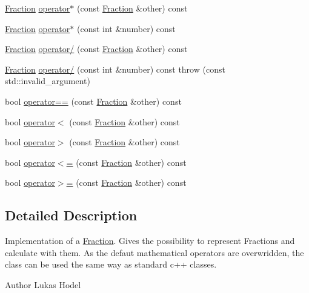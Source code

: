 \begin{DoxyCompactItemize}
\item 
\hyperlink{classFraction}{Fraction} \hyperlink{classFraction_ab742d856770b1ec746aedf6382ee35df}{operator$\ast$} (const \hyperlink{classFraction}{Fraction} \&other) const 
\item 
\hyperlink{classFraction}{Fraction} \hyperlink{classFraction_adfde5a22f3fe5b0b70c3008162ca014b}{operator$\ast$} (const int \&number) const 
\item 
\hyperlink{classFraction}{Fraction} \hyperlink{classFraction_a572eedd14d4ec9e42a65130029aac360}{operator/} (const \hyperlink{classFraction}{Fraction} \&other) const 
\item 
\hyperlink{classFraction}{Fraction} \hyperlink{classFraction_a81c6eb908f902b21dedcbdf50341d4f4}{operator/} (const int \&number) const   throw (const std\-::invalid\-\_\-argument)
\item 
bool \hyperlink{classFraction_a6c59460c8a1694a99173f1546ee5ffe5}{operator==} (const \hyperlink{classFraction}{Fraction} \&other) const 
\item 
bool \hyperlink{classFraction_ac846064d1566945f66bd7bd0bc6708cf}{operator$<$} (const \hyperlink{classFraction}{Fraction} \&other) const 
\item 
bool \hyperlink{classFraction_a447af586d29a0f0175b608262415698b}{operator$>$} (const \hyperlink{classFraction}{Fraction} \&other) const 
\item 
bool \hyperlink{classFraction_a04fbb8fb0170728e8a0b9c1efe0a9c62}{operator$<$=} (const \hyperlink{classFraction}{Fraction} \&other) const 
\item 
bool \hyperlink{classFraction_a178bbf6662c0ee3bf7e275c65355278a}{operator$>$=} (const \hyperlink{classFraction}{Fraction} \&other) const 
\end{DoxyCompactItemize}


\subsection{Detailed Description}
Implementation of a \hyperlink{classFraction}{Fraction}. Gives the possibility to represent Fractions and calculate with them. As the defaut mathematical operators are overwridden, the class can be used the same way as standard c++ classes.

\begin{DoxyAuthor}{Author}
Lukas Hodel 
\end{DoxyAuthor}


